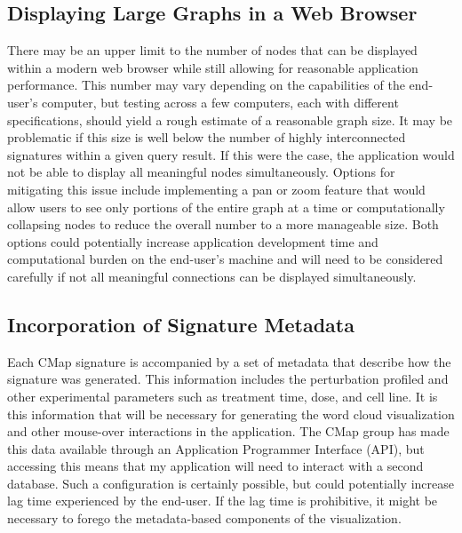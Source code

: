 \documentclass[12pt]{article}
\begin{document}
\subsection{Displaying Large Graphs in a Web Browser}

There may be an upper limit to the number of nodes that can be displayed within a modern web browser while still allowing for reasonable application performance. This number may vary depending on the capabilities of the end-user's computer, but testing across a few computers, each with different specifications, should yield a rough estimate of a reasonable graph size. It may be problematic if this size is well below the number of highly interconnected signatures within a given query result. If this were the case, the application would not be able to display all meaningful nodes simultaneously. Options for mitigating this issue include implementing a pan or zoom feature that would allow users to see only portions of the entire graph at a time or computationally collapsing nodes to reduce the overall number to a more manageable size. Both options could potentially increase application development time and computational burden on the end-user's machine and will need to be considered carefully if not all meaningful connections can be displayed simultaneously.

\subsection{Incorporation of Signature Metadata}

Each CMap signature is accompanied by a set of metadata that describe how the signature was generated. This information includes the perturbation profiled and other experimental parameters such as treatment time, dose, and cell line. It is this information that will be necessary for generating the word cloud visualization and other mouse-over interactions in the application. The CMap group has made this data available through an Application Programmer Interface (API), but accessing this means that my application will need to interact with a second database. Such a configuration is certainly possible, but could potentially increase lag time experienced by the end-user. If the lag time is prohibitive, it might be necessary to forego the metadata-based components of the visualization.


\end{document}
